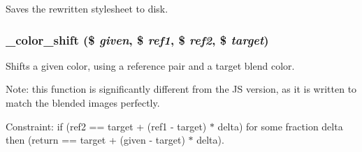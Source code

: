 \label{color_8module_a571b92edd3294e4d7c87092cb3f695d3}
Saves the rewritten stylesheet to disk. \hypertarget{color_8module_ae1e559de5aa681e57757d3505974f40b}{
\subsubsection[{\_\-color\_\-shift}]{\setlength{\rightskip}{0pt plus 5cm}\_\-color\_\-shift (\$ {\em given}, \/  \$ {\em ref1}, \/  \$ {\em ref2}, \/  \$ {\em target})}}
\label{color_8module_ae1e559de5aa681e57757d3505974f40b}
Shifts a given color, using a reference pair and a target blend color.

Note: this function is significantly different from the JS version, as it is written to match the blended images perfectly.

Constraint: if (ref2 == target + (ref1 -\/ target) $\ast$ delta) for some fraction delta then (return == target + (given -\/ target) $\ast$ delta).

